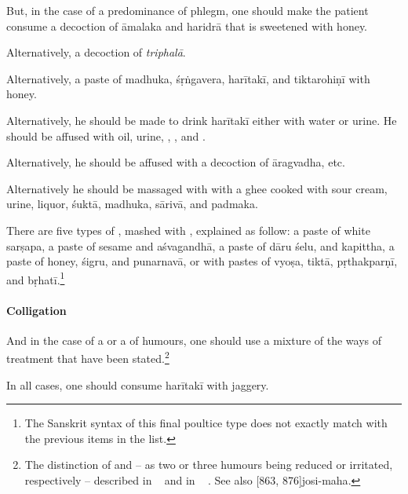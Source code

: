 \begin{translation}
\item[10]

But, in the case of a predominance of
phlegm, one should make the patient 
consume a decoction of
\gls{āmalaka} and \gls{haridrā} that is sweetened with honey.  

Alternatively, a decoction of \textit{triphalā}.

Alternatively, a paste of \gls{madhuka}, \gls{śṛṅgavera},
\gls{harītakī}, and \gls{tiktarohiṇī} with honey. 

Alternatively, he should be made to drink
\gls{harītakī} either with water or urine.   He should be
affused with oil, urine, ,  , and . 
   
Alternatively, he should be affused  with a decoction of \gls{āragvadha}, etc.

Alternatively he should be massaged with 
with a ghee cooked with
sour cream, urine, liquor, \gls{śuktā}, \gls{madhuka},
    \gls{sārivā}, and \gls{padmaka}.
    
There are five types of , mashed with
, explained as follow: %
a paste of white \gls{sarṣapa}, %
a paste of sesame and \gls{aśvagandhā}, %
a paste of \gls{dāru} \gls{śelu}, and \gls{kapittha}, %
a paste of honey, \gls{śigru}, and \gls{punarnavā}, %
or with pastes of \gls{vyoṣa}, \gls{tiktā}, \gls{pṛthakparṇī}, and
\gls{bṛhatī}.\footnote{The Sanskrit syntax of this final poultice type does not
    exactly match with the previous items in the list.}
    
    
\paragraph{Colligation}
    
\item[11] 

And in the case of a  or  a
 of humours, one should use a mixture of the
ways of treatment that have been stated.\footnote{The distinction of
     and  -- as two or
    three humours being reduced or irritated, respectively -- described in
    \CS\  and in \AH\ 
    \parencite[tr.][206]{wuja-2003}. See also [863,
    876]{josi-maha}.}

\item[12]

In all cases, one should consume \gls{harītakī} with jaggery.


\end{translation}

